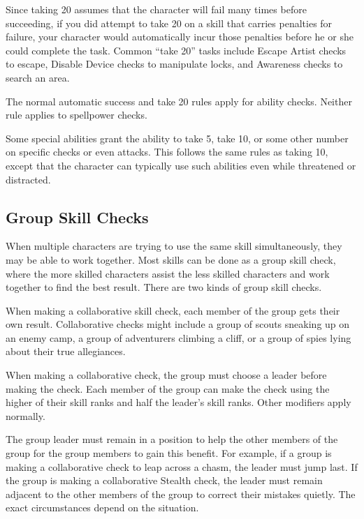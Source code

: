 Since taking 20 assumes that the character will fail many times before succeeding, if you did attempt to take 20 on a skill that carries penalties for failure, your character would automatically incur those penalties before he or she could complete the task. Common ``take 20'' tasks include Escape Artist checks to escape, Disable Device checks to manipulate locks, and Awareness checks to search an area.

 The normal automatic success and take 20 rules apply for ability checks. Neither rule applies to spellpower checks.

 Some special abilities grant the ability to take 5, take 10, or some other number on specific checks or even attacks. This follows the same rules as taking 10, except that the character can typically use such abilities even while threatened or distracted.

\subsection{Group Skill Checks}
When multiple characters are trying to use the same skill simultaneously, they may be able to work together. Most skills can be done as a group skill check, where the more skilled characters assist the less skilled characters and work together to find the best result. There are two kinds of group skill checks.

 When making a collaborative skill check, each member of the group gets their own result. Collaborative checks might include a group of scouts sneaking up on an enemy camp, a group of adventurers climbing a cliff, or a group of spies lying about their true allegiances.

When making a collaborative check, the group must choose a leader before making the check. Each member of the group can make the check using the higher of their skill ranks and half the leader's skill ranks. Other modifiers apply normally.

The group leader must remain in a position to help the other members of the group for the group members to gain this benefit. For example, if a group is making a collaborative check to leap across a chasm, the leader must jump last. If the group is making a collaborative Stealth check, the leader must remain adjacent to the other members of the group to correct their mistakes quietly. The exact circumstances depend on the situation.

